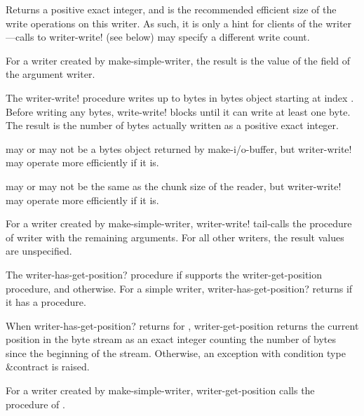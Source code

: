 \begin{entry}{%
}
   
Returns a positive exact integer, and is the recommended efficient
size of the write operations on this writer. As such, it is only a hint for
clients of the writer---calls to {\cf writer-write!} (see below) may specify a
different write count.

For a writer created by {\cf make-simple-writer}, the result is the value of the
 field of the argument writer.
\end{entry}

\begin{entry}{%
}
   
 The {\cf writer-write!} procedure
writes up to  bytes in bytes object 
starting at index . Before writing any bytes, {\cf write-write!} blocks
until it can write at least one byte. The result is the number of bytes
actually written as a positive exact integer.
   
 may or may not be a bytes object returned by {\cf
  make-i/o-buffer}, but {\cf writer-write!} may operate
more efficiently if it is.

 may or may not be the same as the chunk size of the reader, but
 {\cf writer-write!} may operate more efficiently if it is.

For a writer created by {\cf make-simple-writer}, {writer-write!} tail-calls the
 procedure of writer with the remaining arguments.  For
all other writers, the result values are unspecified.
\end{entry}   

\begin{entry}{%
}

The {\cf writer-has-get-position?} procedure \schtrue{} if 
supports the {\cf writer-get-position} procedure, and \schfalse{}
otherwise.  For a simple writer, {\cf writer-has-get-position?}
returns \schtrue{} if it has a  procedure.
   
When {\cf writer-has-get-position?} returns \schtrue{} for
, {\cf writer-get-position}
returns the current position in the byte stream as
an exact integer counting the number of bytes since the beginning of
the stream.  Otherwise, an exception with condition
type {\cf\&contract} is raised.

For a writer created by {\cf make-simple-writer}, {\cf
  writer-get-position} calls the  procedure of
.
\end{entry}

